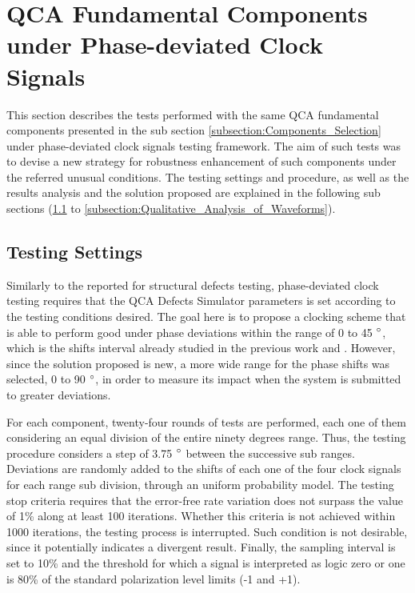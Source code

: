 \section{QCA Fundamental Components under Phase-deviated Clock Signals}

This section describes the tests performed with the same QCA fundamental components presented in the sub section \ref{subsection:Components_Selection} under phase-deviated clock signals testing framework. The aim of such tests was to devise a new strategy for robustness enhancement of such components under the referred unusual conditions. The testing settings and procedure, as well as the results analysis and the solution proposed are explained in the following sub sections (\ref{subsection:Clock_Testing_Settings} to \ref{subsection:Qualitative_Analysis_of_Waveforms}).

\subsection{Testing Settings}
\label{subsection:Clock_Testing_Settings}

Similarly to the reported for structural defects testing, phase-deviated clock testing requires that the QCA Defects Simulator parameters is set according to the testing conditions desired. The goal here is to propose a clocking scheme that is able to perform good under phase deviations within the range of 0 to 45 $\degree$, which is the shifts interval already studied in the previous work \cite{ottavi07} and \cite{karim09}. However, since the solution proposed is new, a more wide range for the phase shifts was selected, 0 to 90 $\degree$, in order to measure its impact when the system is submitted to greater deviations.

For each component, twenty-four rounds of tests are performed, each one of them considering an equal division of the entire ninety degrees range. Thus, the testing procedure considers a step of 3.75 $\degree$ between the successive sub ranges. Deviations are randomly added to the shifts of each one of the four clock signals for each range sub division, through an uniform probability model. The testing stop criteria requires that the error-free rate variation does not surpass the value of 1\% along at least 100 iterations. Whether this criteria is not achieved within 1000 iterations, the testing process is interrupted. Such condition is not desirable, since it potentially indicates a divergent result. Finally, the sampling interval is set to 10\% and the threshold for which a signal is interpreted as logic zero or one is 80\% of the standard polarization level limits (-1 and +1).

